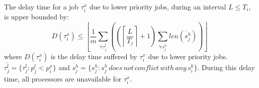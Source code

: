 \begin{clm}\label{delay}
The delay time for a 
job $\tau_{i}^{x}$ due to lower priority jobs,
during an interval $L\le T_{i}$, is upper bounded by:
\begin{equation}
D(\tau_{i}^{x})\le\left\lfloor \frac{1}{m}\sum_{\forall\bar{\tau_{j}^{l}}}\left(\left(\left\lceil \frac{L}{T_{j}}\right\rceil +1\right)\sum_{\forall\ddot{s_{j}^{h}}}len\left(\ddot{s_{j}^{h}}\right)\right)\right\rfloor \label{P-N-F-delay}
\end{equation}
where $D(\tau_{i}^{x})$ is the delay time 
suffered by $\tau_{i}^{x}$
due to lower priority jobs. $\bar{\tau_{j}^{l}}=\{\tau_{j}^{l}:p_{j}^{l}<p_{i}^{x}\}$
and $\ddot{s_{j}^{h}}=\{s_{j}^{h}:s_{j}^{h}\, does\, not\, conflict\, with\, any\, s_{i}^{k}\}$.
During this delay time, 
all processors are unavailable for $\tau_{i}^{x}$.
\end{clm}
